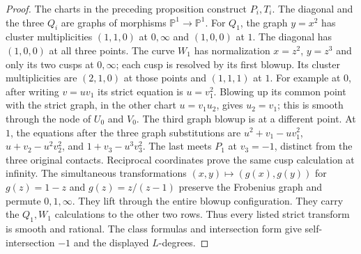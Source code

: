 \documentclass[11pt,reqno]{amsart}
\theoremstyle{definition}
\theoremstyle{remark}
\newcommand{\PP}{\mathbb P}
\numberwithin{equation}{section}
\begin{document}
\begin{proof}
The charts in the preceding proposition construct $P_i,T_i$.
The diagonal and the three $Q_i$ are graphs of morphisms $\PP^1\to\PP^1$.
For $Q_1$, the graph $y=x^2$ has cluster multiplicities $(1,1,0)$ at
$0,\infty$ and $(1,0,0)$ at $1$.
The diagonal has $(1,0,0)$ at all three points.
The curve $W_1$ has normalization $x=z^2$, $y=z^3$ and only its two
cusps at $0,\infty$; each cusp is resolved by its first blowup.
Its cluster multiplicities are $(2,1,0)$ at those points and $(1,1,1)$
at $1$. For example at $0$, after writing $v=uv_1$ its strict equation
is $u=v_1^2$. Blowing up its common point with the strict graph, in the
other chart $u=v_1u_2$, gives $u_2=v_1$; this is smooth through the node
of $U_0$ and $V_0$. The third graph blowup is at a different point.
At $1$, the equations after the three graph substitutions are
$u^2+v_1-uv_1^2$, $u+v_2-u^2v_2^2$, and $1+v_3-u^3v_3^2$.
The last meets $P_1$ at $v_3=-1$, distinct from the three original contacts.
Reciprocal coordinates prove the same cusp calculation at infinity.
The simultaneous transformations $(x,y)\mapsto(g(x),g(y))$ for
$g(z)=1-z$ and $g(z)=z/(z-1)$ preserve the Frobenius graph and permute
$0,1,\infty$. They lift through the entire blowup configuration.
They carry the $Q_1,W_1$ calculations to the other two rows.
Thus every listed strict transform is smooth and rational.
The class formulas and intersection form give self-intersection $-1$
and the displayed $L$-degrees.


\end{proof}
\end{document}
